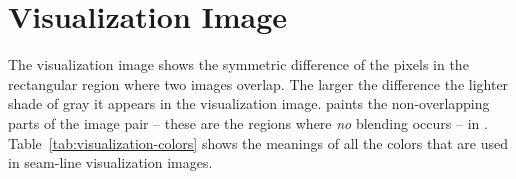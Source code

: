 

\chapter[Visualization Image]{Visualization Image
  \label{sec:visualization-image}
  }

The visualization image shows the symmetric difference of the pixels
in the rectangular region where two images overlap.  The larger the
difference the lighter shade of gray it appears in the visualization
image.  \App{} paints the non-overlapping parts of the image pair --
these are the regions where \emph{no} blending occurs -- in
.
Table~\ref{tab:visualization-colors} shows the meanings of all the
colors that are used in seam-line visualization images.

